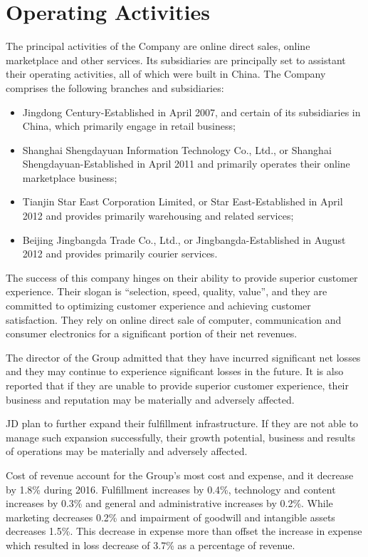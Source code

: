 \section{Operating Activities}
The principal activities of the Company are online direct sales, online marketplace and other services. Its subsidiaries are principally set to assistant their operating activities, all of which were built in China.
The Company comprises the following branches and subsidiaries:
\begin{itemize}
\item Jingdong Century-Established in April 2007, and certain of its subsidiaries in China, which primarily engage in retail business;
\item	Shanghai Shengdayuan Information Technology Co., Ltd., or Shanghai Shengdayuan-Established in April 2011 and primarily operates their online marketplace business;
\item	Tianjin Star East Corporation Limited, or Star East-Established in April 2012 and provides primarily warehousing and related services;
\item	Beijing Jingbangda Trade Co., Ltd., or Jingbangda-Established in August 2012 and provides primarily courier services.
\end{itemize}

The success of this company hinges on their ability to provide superior customer experience. Their slogan is “selection, speed, quality, value”, and they are committed to optimizing customer experience and achieving customer satisfaction. They rely on online direct sale of computer, communication and consumer electronics for a significant portion of their net revenues.

The director of the Group admitted that they have incurred significant net losses and they may continue to experience significant losses in the future. It is also reported that if they are unable to provide superior customer experience, their business and reputation may be materially and adversely affected.

JD plan to further expand their fulfillment infrastructure. If they are not able to manage such expansion successfully, their growth potential, business and results of operations may be materially and adversely affected.

Cost of revenue account for the Group’s most cost and expense, and it decrease by 1.8\% during 2016. Fulfillment increases by 0.4\%, technology and content increases by 0.3\% and general and administrative increases by 0.2\%. While marketing decreases 0.2\% and impairment of goodwill and intangible assets decreases 1.5\%. This decrease in expense more than offset the increase in expense which resulted in loss decrease of 3.7\% as a percentage of revenue.

